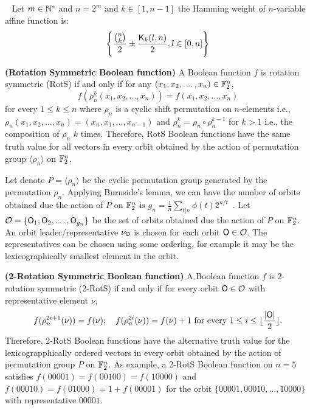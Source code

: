 \documentclass{llncs}
\begin{document}
\begin{proposition}~\cite{DAM:GinMea22}
Let $m \in \mathbb{N}^*$ and $ n = 2^m$ and $k \in [1,n-1]$ the Hamming weight of $n$-variable affine function is:
$$ \left\{  \frac{{ n \choose k}}{2} \pm \frac{\mathsf{K}_{k}(l,n)}{2},  l \in [0,n]  \right\} $$ 
\end{proposition}
\fi
\noindent\textbf{(Rotation Symmetric Boolean function)}
A Boolean function $f$ is rotation symmetric (RotS) if and only if for any $(x_1,x_2,\ldots,x_n)\in \mathbb{F}_2^n$,
$$ f(\rho_n^k(x_1,x_2,\ldots,x_n))= f(x_1,x_2,\ldots,x_n) $$ for every $1 \leq k \leq n$ where $\rho_n$ is a cyclic shift permutation on $n$-elements i.e., $\rho_n(x_1,x_2,\ldots,x_n) = (x_n,x_1,\ldots,x_{n-1})$ and $\rho_n^k = \rho_n \circ \rho_n^{k-1}$ for $k > 1$ i.e., the composition of $\rho_n$ $k$ times.%
Therefore, RotS Boolean functions have the same truth value for all vectors in every orbit obtained by the action of permutation group $\langle \rho_n \rangle$ on $\mathbb{F}_2^n$. 

Let denote $P = \langle \rho_n \rangle$ be the cyclic permutation group generated by the permutation $\rho_n$. Applying Burnside's lemma, we can have the number of orbits obtained due the action of $P$ on $\mathbb{F}_2^n$ is $g_n = \frac{1}{n}\sum_{t \vert n} \phi(t) 2^{n/t}$~\cite{DAM:SM08}. Let $\mathcal{O} = \{\mathsf{O}_1, \mathsf{O}_2,\ldots, \mathsf{O}_{g_n}\}$ be the set of orbits obtained due the action of $P$ on $\mathbb{F}_2^n$. An orbit leader/representative $\nu_{\mathsf{O}}$ is chosen for each orbit $\mathsf{O} \in \mathcal{O}$. The representatives can be chosen using some ordering, for example it may be the lexicographically smallest element in the orbit.

\noindent\textbf{(2-Rotation Symmetric Boolean function)}
A Boolean function $f$ is 2-rotation symmetric (2-RotS) if and only if 
for every orbit $\mathsf{O} \in \mathcal{O}$ with representative element $\nu$,
$$f(\rho_n^{2i+1}(\nu)) = f(\nu);~~~ f(\rho_n^{2i}(\nu)) = f(\nu)+1 \text{ for every } 1 \leq i \leq \lfloor\frac{|\mathsf{O}|}{2}\rfloor.$$ 
Therefore, 2-RotS Boolean functions have the alternative truth value for the lexicograpphically ordered vectors in every orbit obtained by the action of permutation group $P$ on $\mathbb{F}_2^n$. 
As example, a 2-RotS Boolean function on $n = 5$ satisfies $f(00001) = f(00100) = f(10000)$ and $f(00010) = f(01000) = 1+f(00001)$ for the orbit $\{00001, 00010, \ldots, 10000\}$ with representative  $00001$.
\end{document}

